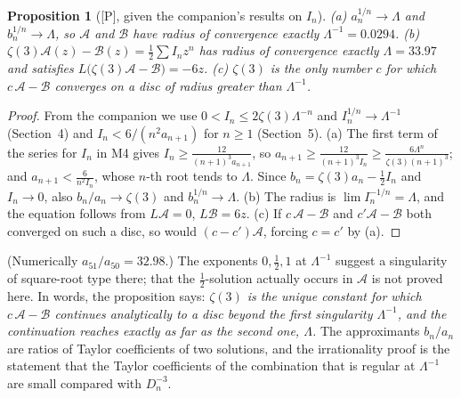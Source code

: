 \documentclass[11pt,a4paper]{article}
\newcommand{\cA}{\mathcal A}
\newcommand{\cB}{\mathcal B}
\newcommand{\st}[1]{\textsf{[#1]}}
\newtheorem{proposition}[theorem]{Proposition}
\theoremstyle{definition}
\begin{document}
\begin{proposition}[\st{P}, given the companion's results on $I_n$]\label{prop:ode}
\textup{(a)} $a_n^{1/n}\to\Lambda$ and $b_n^{1/n}\to\Lambda$, so $\cA$ and $\cB$ have radius of
convergence exactly $\Lambda^{-1}=0.0294$.
\textup{(b)} $\zeta(3)\cA(z)-\cB(z)=\frac12\sum I_nz^n$ has radius of convergence exactly
$\Lambda=33.97$ and satisfies $L\bigl(\zeta(3)\cA-\cB\bigr)=-6z$.
\textup{(c)} $\zeta(3)$ is the only number $c$ for which $c\,\cA-\cB$ converges on a disc of radius
greater than $\Lambda^{-1}$.
\end{proposition}
\begin{proof}
From the companion we use $0<I_n\le2\zeta(3)\Lambda^{-n}$ and $I_n^{1/n}\to\Lambda^{-1}$ (Section~4)
and $I_n<6/(n^2a_{n+1})$ for $n\ge1$ (Section~5).
(a) The first term of the series for $I_n$ in M4 gives $I_n\ge\frac{12}{(n+1)^3a_{n+1}}$, so
$a_{n+1}\ge\frac{12}{(n+1)^3I_n}\ge\frac{6\Lambda^n}{\zeta(3)(n+1)^3}$; and $a_{n+1}<\frac6{n^2I_n}$,
whose $n$-th root tends to $\Lambda$. Since $b_n=\zeta(3)a_n-\frac12I_n$ and $I_n\to0$, also
$b_n/a_n\to\zeta(3)$ and $b_n^{1/n}\to\Lambda$.
(b) The radius is $\lim I_n^{-1/n}=\Lambda$, and the equation follows from $L\cA=0$, $L\cB=6z$.
(c) If $c\,\cA-\cB$ and $c'\cA-\cB$ both converged on such a disc, so would $(c-c')\cA$, forcing
$c=c'$ by (a).
\end{proof}
(Numerically $a_{51}/a_{50}=32.98$.) The exponents $0,\frac12,1$ at $\Lambda^{-1}$ suggest a
singularity of square-root type there; that the $\frac12$-solution actually occurs in $\cA$ is not
proved here. In words, the proposition says:
\emph{$\zeta(3)$ is the unique constant for which $c\,\cA-\cB$ continues analytically to a disc beyond
the first singularity $\Lambda^{-1}$, and the continuation reaches exactly as far as the second one,
$\Lambda$.} The approximants $b_n/a_n$ are
ratios of Taylor coefficients of two solutions, and the irrationality proof is the statement that
the Taylor coefficients of the combination that is regular at $\Lambda^{-1}$ are small compared with
$D_n^{-3}$.
\end{document}
